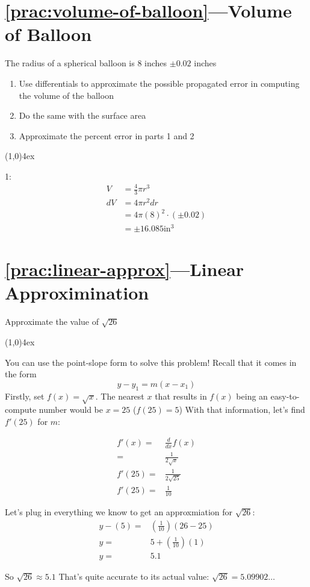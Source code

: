 \documentclass{MathNotes}
\newcommand{\br}{
	\begin{center}
		\line(1,0){4ex}
	\end{center}}
\begin{document}
\section*{\ref{prac:volume-of-balloon}---Volume of Balloon}\label{ans:volume-of-balloon}
The radius of a spherical balloon is 8 inches $\pm 0.02$ inches
\begin{enumerate}
	\item Use differentials to approximate the possible propagated error in computing the volume of the balloon
	\item Do the same with the surface area
	\item Approximate the percent error in parts 1 and 2
\end{enumerate}
\br
1:
\begin{align*}
	V  & =\frac{4}{3}\pi r^3       \\
	dV & =4\pi r^2 dr              \\
	   & =4\pi(8)^2\cdot(\pm 0.02) \\
	   & =\pm 16.085 \text{in}^3
\end{align*}

\section*{\ref{prac:linear-approx}---Linear Approximination}\label{ans:linear-approx}
Approximate the value of $\sqrt{26}$
\br
You can use the point-slope form to solve this problem! Recall that it comes in
the form \[y-y_1=m(x-x_1)\] Firstly, set $f(x)=\sqrt{x}$. The nearest $x$ that
results in $f(x)$ being an easy-to-compute number would be $x=25$ ($f(25)=5$)
With that information, let's find $f'(25)$ for $m$:

\begin{align*}
	f'(x) =  & \frac{d}{dx}f(x)     \\
	=        & \frac{1}{2\sqrt{x}}  \\
	f'(25) = & \frac{1}{2\sqrt{25}} \\
	f'(25) = & \frac{1}{10}
\end{align*}

Let's plug in everything we know to get an approxmiation for $\sqrt{26}$:
\begin{align*}
	y-(5) = & (\frac{1}{10})(26-25) \\
	y =     & 5 + (\frac{1}{10})(1) \\
	y =     & 5.1
\end{align*}

So $\sqrt{26}\approx 5.1$\newline
That's quite accurate to its actual value: $\sqrt{26}=5.09902\ldots$
\end{document}
